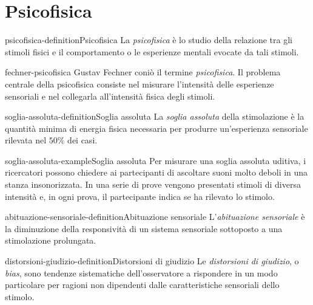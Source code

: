 \documentclass[preview]{standalone}
\begin{document}
\genpage

\section{Psicofisica}

\begin{snippetdefinition}{psicofisica-definition}{Psicofisica}
    La \emph{psicofisica} è lo studio della relazione tra gli stimoli fisici e
    il comportamento o le esperienze mentali evocate da tali stimoli.
\end{snippetdefinition}

\begin{snippet}{fechner-psicofisica}
    Gustav Fechner coniò il termine \emph{psicofisica}. Il problema centrale
    della psicofisica consiste nel misurare l'intensità delle esperienze
    sensoriali e nel collegarla all'intensità fisica degli stimoli.
\end{snippet}

\begin{snippetdefinition}{soglia-assoluta-definition}{Soglia assoluta}
    La \emph{soglia assoluta} della stimolazione è la quantità minima di energia
    fisica necessaria per produrre un'esperienza sensoriale rilevata nel
    \(50\%\) dei casi.
\end{snippetdefinition}

\begin{snippetexample}{soglia-assoluta-example}{Soglia assoluta}
    Per misurare una soglia assoluta uditiva, i ricercatori possono chiedere ai
    partecipanti di ascoltare suoni molto deboli in una stanza insonorizzata.
    In una serie di prove vengono presentati stimoli di diversa intensità e, in
    ogni prova, il partecipante indica se ha rilevato lo stimolo.
\end{snippetexample}


\begin{snippetdefinition}{abituazione-sensoriale-definition}{Abituazione sensoriale}
    L'\emph{abituazione sensoriale} è la diminuzione della responsività di un
    sistema sensoriale sottoposto a una stimolazione prolungata.
\end{snippetdefinition}

\begin{snippetdefinition}{distorsioni-giudizio-definition}{Distorsioni di giudizio}
    Le \emph{distorsioni di giudizio}, o \emph{bias}, sono tendenze sistematiche
    dell'osservatore a rispondere in un modo particolare per ragioni non
    dipendenti dalle caratteristiche sensoriali dello stimolo.
\end{snippetdefinition}
\end{document}

